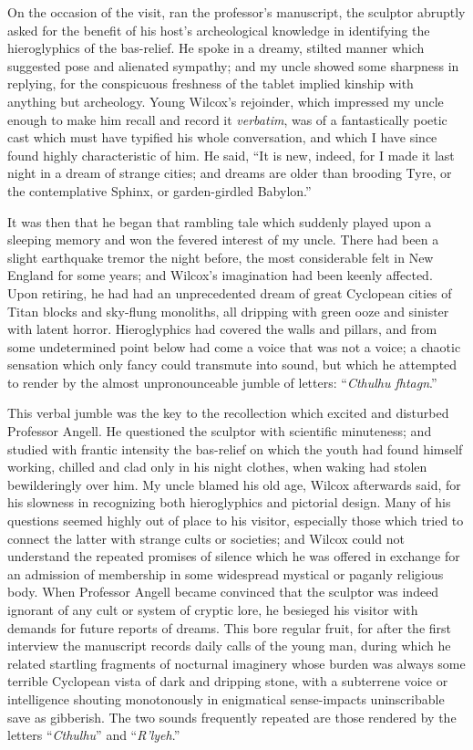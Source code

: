 On the occasion of the visit, ran the professor's manuscript, the
sculptor abruptly asked for the benefit of his host's archeological
knowledge in identifying the hieroglyphics of the bas-relief. He spoke
in a dreamy, stilted manner which suggested pose and alienated sympathy;
and my uncle showed some sharpness in replying, for the conspicuous
freshness of the tablet implied kinship with anything but archeology.
Young Wilcox's rejoinder, which impressed my uncle enough to make him
recall and record it \emph{verbatim}, was of a fantastically poetic cast which
must have typified his whole conversation, and which I have since found
highly characteristic of him. He said, ``It is new, indeed, for I made
it last night in a dream of strange cities; and dreams are older than
brooding Tyre, or the contemplative Sphinx, or garden-girdled Babylon.''

It was then that he began that rambling tale which suddenly played upon
a sleeping memory and won the fevered interest of my uncle. There had been a slight earthquake tremor the night before, the most considerable
felt in New England for some years; and Wilcox's imagination had been
keenly affected. Upon retiring, he had had an unprecedented dream of
great Cyclopean cities of Titan blocks and sky-flung monoliths, all
dripping with green ooze
and sinister with latent horror. Hieroglyphics
had covered the walls and pillars, and from some undetermined point
below had come a voice that was not a voice; a chaotic sensation which
only fancy could transmute into sound, but which he attempted to render
by the almost unpronounceable jumble of letters: ``\emph{Cthulhu fhtagn}.''

This verbal jumble was the key to the recollection which excited and
disturbed Professor Angell. He questioned the sculptor with scientific
minuteness; and studied with frantic intensity the bas-relief on which
the youth had found himself working, chilled and clad only in his night
clothes, when waking had stolen bewilderingly over him. My uncle blamed
his old age, Wilcox afterwards said, for his slowness in recognizing
both hieroglyphics and pictorial design. Many of his questions seemed
highly out of place to his visitor, especially those which tried to
connect the latter with strange cults or societies; and Wilcox could not
understand the repeated promises of silence which he was offered in
exchange for an admission of membership in some widespread mystical or
paganly religious body. When Professor Angell became convinced that the
sculptor was indeed ignorant of any cult or system of cryptic lore, he
besieged his visitor with demands for future reports of dreams. This
bore regular fruit, for after the first interview the manuscript records
daily calls of the young man, during which he related startling
fragments of nocturnal imaginery whose burden was always some terrible
Cyclopean vista of dark and dripping stone, with a subterrene voice or
intelligence shouting monotonously in enigmatical sense-impacts
uninscribable save as gibberish. The two sounds frequently repeated are
those rendered by the letters ``\emph{Cthulhu}'' and ``\emph{R'lyeh}.''

